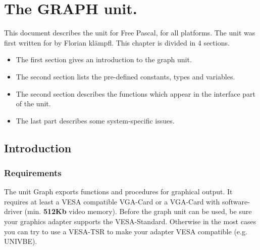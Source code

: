 %
%
%
%
%
\chapter{The GRAPH unit.}
This document describes the  unit for Free Pascal, for all
platforms. The unit was first written for \dos by Florian kl\"ampfl. 
This chapter is divided in 4 sections. 
\begin{itemize}
\item The first section gives an introduction to the graph unit.
\item The second section lists the pre-defined constants, types and variables. 
\item The second section describes the functions which appear in the
interface part of the  unit.
\item The last part describes some system-specific issues.

\end{itemize}
\section{Introduction}
\label{se:Introduction}
\subsection{Requirements}
The unit Graph exports functions and procedures for graphical output.
It requires at least a VESA compatible VGA-Card or a VGA-Card with software-driver
(min. \textbf{512Kb} video memory).
Before the graph unit can be used, be sure your graphics adapter supports
the VESA-Standard. Otherwise in the most cases you can try to use a VESA-TSR
to make your adapter VESA compatible (e.g. UNIVBE).
